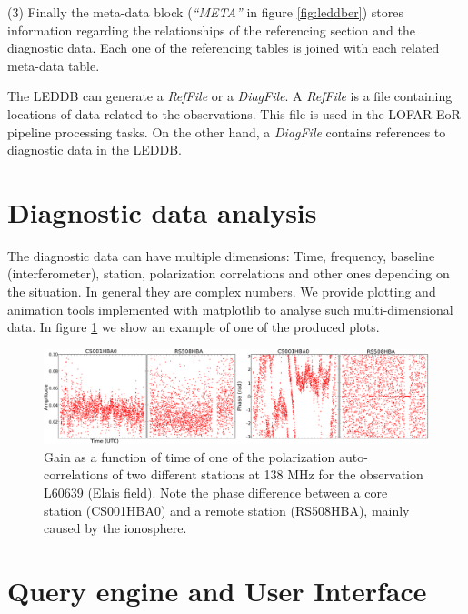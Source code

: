 \documentclass[11pt,twoside]{article}
\begin{document}
(3) Finally the meta-data block (\textit{``META''} in figure \ref{fig:leddber}) stores information regarding the relationships of the referencing section and the diagnostic data. Each one of the referencing tables is joined with each related meta-data table.

The LEDDB can generate a \textit{RefFile} or a \textit{DiagFile}. A \textit{RefFile} is a file containing locations of data related to the observations. This file is used in the LOFAR EoR pipeline processing tasks. On the other hand, a \textit{DiagFile} contains references to diagnostic data in the LEDDB.

\section{Diagnostic data analysis}
The diagnostic data can have multiple dimensions: Time, frequency, baseline (interferometer), station, polarization correlations and other ones depending on the situation. In general they are complex numbers. We provide plotting and animation tools implemented with matplotlib to analyse such multi-dimensional data. In figure \ref{fig:gain} we show an example of one of the produced plots.
\begin{figure}[!ht]
  \centering
    \includegraphics[scale=0.19]{O23_f2.eps} 
  \caption{Gain as a function of time of one of the polarization auto-correlations of two different stations at 138 MHz for the observation L60639 (Elais field). Note the phase difference between a core station (CS001HBA0) and a remote station (RS508HBA), mainly caused by the ionosphere.}
  \label{fig:gain}
\end{figure}

\section{Query engine and User Interface}
\end{document}
